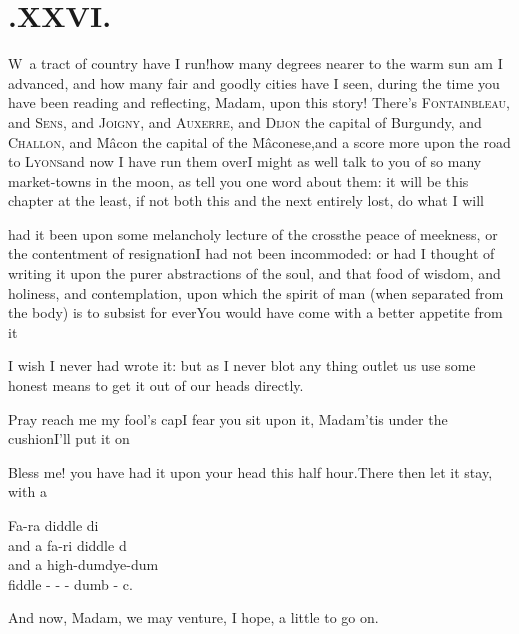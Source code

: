 \documentclass{article}
\begin{document}
\vfill{}\eject

\null\smallskip
\section{.\enspace XXVI.}

\lettrine{W}{\,} a tract of country have I
run!\tsk how many degrees nearer to the warm sun am I advanced,
and how many fair and goodly cities have I seen, during the time
you have been reading and reflecting, Madam, upon this story!
There’s \textsc{Fontainbleau}, and \textsc{Sens},
and \textsc{Joigny}, and \textsc{Auxerre}, and
\textsc{Dijon} the capital of Burgundy, and
\textsc{Challon}, and Mâcon the capital of the
Mâconese,\break and a score more upon the road to
\textsc{Lyons}\tsh and now I have run them
over\tsh I might as well talk to you of so many market-towns in the moon, as tell
you one word about them: it will be this chapter at the least, if not both this
and the next entirely lost, do what I will\tsh

\noindent
{}

\noindent
{}\break
had it been upon some melancholy lecture of the
cross\tsk the peace of meekness, or the contentment of
resignation\tsh I had not been incommoded: or had I thought of writing
it upon the purer abstractions of the soul, and that food of wisdom,
and holiness, and contemplation, upon which the spirit of man (when
separated from the body) is to subsist for ever\tsh You
would have come with a better appetite from it\tsh

\tsh I wish I never had wrote it: but as I never blot
any thing out\tsh let us use some honest means to get it
out of our heads directly.

\tsh Pray reach me my fool’s cap\tsh I
fear you sit upon it, Madam\tsh ’tis under the
cushion\tsh I’ll put it on\tsh

Bless me! you have had it upon your head this half
hour.\tsh There then let it stay, with a

Fa-ra diddle di\\\indent
and a fa-ri diddle d\\\indent
and a high-dum\tsk dye-dum\\\indent
\quad fiddle - - - dumb - c.

\noindent
And now, Madam, we may venture, I hope, a little to go on.

\vfill{}\eject
\end{document}
